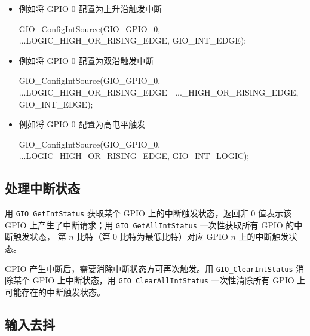 \documentclass[
  12pt,
]{book}
\newenvironment{Shaded}{\begin{snugshade}}{\end{snugshade}}
\newcommand{\NormalTok}[1]{#1}
\begin{document}
\begin{itemize}
\item
  例如将 GPIO 0 配置为上升沿触发中断

\begin{Shaded}
\begin{Highlighting}[]
\NormalTok{GIO_ConfigIntSource(GIO_GPIO_0,}
\NormalTok{  ...LOGIC_HIGH_OR_RISING_EDGE,}
\NormalTok{  GIO_INT_EDGE);}
\end{Highlighting}
\end{Shaded}
\item
  例如将 GPIO 0 配置为双沿触发中断

\begin{Shaded}
\begin{Highlighting}[]
\NormalTok{GIO_ConfigIntSource(GIO_GPIO_0,}
\NormalTok{  ...LOGIC_HIGH_OR_RISING_EDGE | ..._HIGH_OR_RISING_EDGE,}
\NormalTok{  GIO_INT_EDGE);}
\end{Highlighting}
\end{Shaded}
\item
  例如将 GPIO 0 配置为高电平触发

\begin{Shaded}
\begin{Highlighting}[]
\NormalTok{GIO_ConfigIntSource(GIO_GPIO_0,}
\NormalTok{  ...LOGIC_HIGH_OR_RISING_EDGE,}
\NormalTok{  GIO_INT_LOGIC);}
\end{Highlighting}
\end{Shaded}
\end{itemize}

\hypertarget{ux5904ux7406ux4e2dux65adux72b6ux6001}{%
\subsection{处理中断状态}\label{ux5904ux7406ux4e2dux65adux72b6ux6001}}

用 \texttt{GIO\_GetIntStatus} 获取某个 GPIO 上的中断触发状态，返回非 0 值表示该 GPIO
上产生了中断请求；用 \texttt{GIO\_GetAllIntStatus} 一次性获取所有 GPIO 的中断触发状态，
第 \(n\) 比特（第 0 比特为最低比特）对应 GPIO \(n\) 上的中断触发状态。

GPIO 产生中断后，需要消除中断状态方可再次触发。用 \texttt{GIO\_ClearIntStatus} 消除某个 GPIO
上中断状态，用 \texttt{GIO\_ClearAllIntStatus} 一次性清除所有 GPIO 上可能存在的中断触发状态。

\hypertarget{ux8f93ux5165ux53bbux6296}{%
\subsection{输入去抖}\label{ux8f93ux5165ux53bbux6296}}
\end{document}
